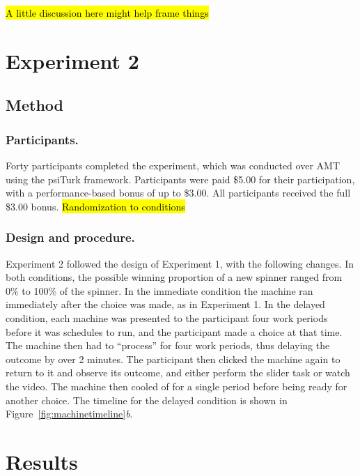 \documentclass[10pt,letterpaper]{article}
\begin{document}
\hl{A little discussion here might help frame things}

\section{Experiment 2}

\subsection{Method}

\subsubsection{Participants.}

Forty participants completed the experiment, which was conducted over
AMT using the psiTurk framework.
Participants were paid \$5.00 for their participation, with a performance-based
bonus of up to \$3.00. All participants received the full \$3.00 bonus.
\hl{Randomization to conditions}

\subsubsection{Design and procedure.}

Experiment 2 followed the design of Experiment 1, with the following changes. In
both conditions, the possible winning proportion of a new spinner ranged from 0\% to 100\% of
the spinner. In the immediate condition the machine ran immediately after the
choice was made, as in Experiment 1. In the delayed condition, each machine was
presented to the participant four work periods before it was schedules to run,
and the participant made a choice at that time. The machine then had to
``process'' for four work periods, thus delaying
the outcome by over 2 minutes. The participant then clicked the machine again to
return to it and observe its outcome, and either perform the slider task or
watch the video. The machine then cooled of for a single period before being
ready for another choice. The timeline for the delayed condition is shown in
Figure~\ref{fig:machinetimeline}\emph{b}.

\section{Results}
\end{document}
